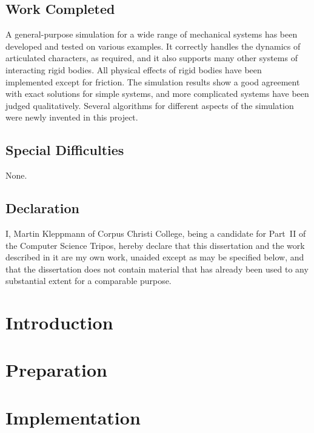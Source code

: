 \documentclass[11pt,a4paper,twoside,notitlepage]{report}
\begin{document}
\section*{Work Completed}
A general-purpose simulation for a wide range of mechanical systems has been developed and tested
on various examples. It correctly handles the dynamics of articulated characters, as required,
and it also supports many other systems of interacting rigid bodies. All physical effects
of rigid bodies have been implemented except for friction. The simulation results show a good
agreement with exact solutions for simple systems, and more complicated systems have been
judged qualitatively. Several algorithms for different aspects of the simulation were newly
invented in this project.

\section*{Special Difficulties}
None.

\newpage
\vspace*{60mm}
\section*{Declaration}

I, Martin Kleppmann of Corpus Christi College, being a candidate for Part~II of the Computer
Science Tripos, hereby declare that this dissertation and the work described in it are my own
work, unaided except as may be specified below, and that the dissertation does not contain
material that has already been used to any substantial extent for a comparable purpose.

\vspace{20mm}
\vspace{12mm}
\cleardoublepage

\tableofcontents
\chapter{Introduction}

\chapter{Preparation}




\chapter{Implementation}


\end{document}
